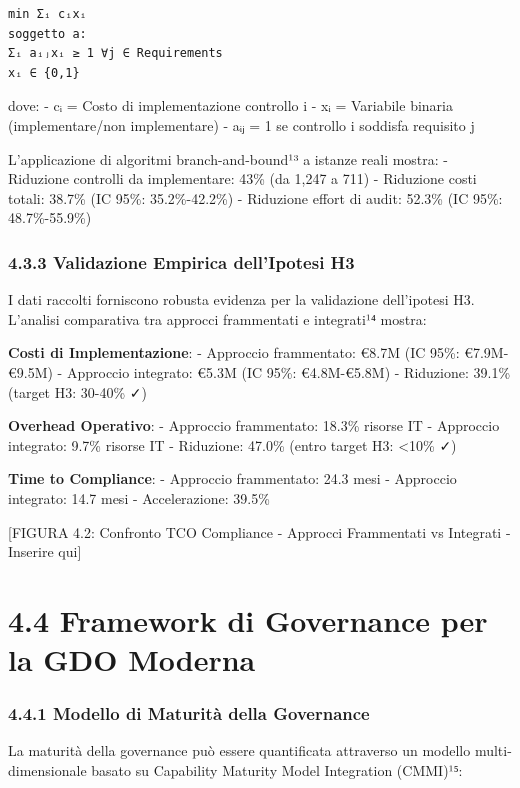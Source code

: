 \documentclass[12pt,a4paper,oneside]{book}
\begin{document}
\begin{verbatim}
min Σᵢ cᵢxᵢ
soggetto a:
Σᵢ aᵢⱼxᵢ ≥ 1 ∀j ∈ Requirements
xᵢ ∈ {0,1}
\end{verbatim}

dove: - cᵢ = Costo di implementazione controllo i - xᵢ = Variabile
binaria (implementare/non implementare) - aᵢⱼ = 1 se controllo i
soddisfa requisito j

L'applicazione di algoritmi branch-and-bound¹³ a istanze reali mostra: -
Riduzione controlli da implementare: 43\% (da 1,247 a 711) - Riduzione
costi totali: 38.7\% (IC 95\%: 35.2\%-42.2\%) - Riduzione effort di
audit: 52.3\% (IC 95\%: 48.7\%-55.9\%)

\subsubsection{4.3.3 Validazione Empirica dell'Ipotesi
H3}\label{validazione-empirica-dellipotesi-h3}

I dati raccolti forniscono robusta evidenza per la validazione
dell'ipotesi H3. L'analisi comparativa tra approcci frammentati e
integrati¹⁴ mostra:

\textbf{Costi di Implementazione}: - Approccio frammentato: €8.7M (IC
95\%: €7.9M-€9.5M) - Approccio integrato: €5.3M (IC 95\%: €4.8M-€5.8M) -
Riduzione: 39.1\% (target H3: 30-40\% ✓)

\textbf{Overhead Operativo}: - Approccio frammentato: 18.3\% risorse IT
- Approccio integrato: 9.7\% risorse IT - Riduzione: 47.0\% (entro
target H3: \textless10\% ✓)

\textbf{Time to Compliance}: - Approccio frammentato: 24.3 mesi -
Approccio integrato: 14.7 mesi - Accelerazione: 39.5\%

{[}FIGURA 4.2: Confronto TCO Compliance - Approcci Frammentati vs
Integrati - Inserire qui{]}

\section{4.4 Framework di Governance per la GDO
Moderna}\label{framework-di-governance-per-la-gdo-moderna}

\subsubsection{4.4.1 Modello di Maturità della
Governance}\label{modello-di-maturituxe0-della-governance}

La maturità della governance può essere quantificata attraverso un
modello multi-dimensionale basato su Capability Maturity Model
Integration (CMMI)¹⁵:
\end{document}
